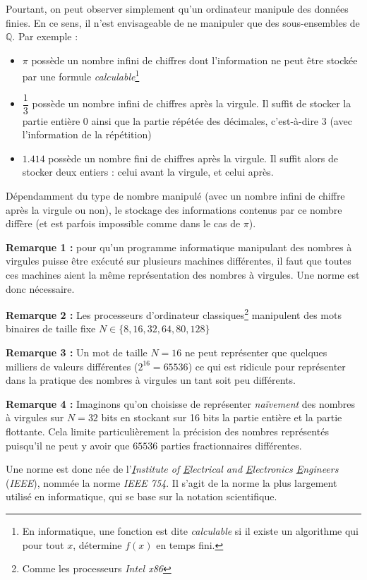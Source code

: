 \documentclass[../../main.tex]{subfiles}
\begin{document}
Pourtant, on peut observer simplement qu'un ordinateur manipule des données finies. En ce sens, il n'est envisageable de ne manipuler que des sous-ensembles de $\mathbb{Q}$. Par exemple :
\begin{itemize}
     \item $\pi$ possède un nombre infini de chiffres dont l'information ne peut être stockée par une formule \textit{calculable}\footnote{En informatique, une fonction est dite \textit{calculable} si il existe un algorithme qui pour tout $x$, détermine $f(x)$ en temps fini.}
     \item $\dfrac{1}{3}$ possède un nombre infini de chiffres après la virgule. Il suffit de stocker la partie entière $0$ ainsi que la partie répétée des décimales, c'est-à-dire $3$ (avec l'information de la répétition)
     \item $1.414$ possède un nombre fini de chiffres après la virgule. Il suffit alors de stocker deux entiers : celui avant la virgule, et celui après.
\end{itemize}
Dépendamment du type de nombre manipulé (avec un nombre infini de chiffre après la virgule ou non), le stockage des informations contenus par ce nombre diffère (et est parfois impossible comme dans le cas de $\pi$).

\textbf{Remarque 1 :} pour qu'un programme informatique manipulant des nombres à virgules puisse être exécuté sur plusieurs machines différentes, il faut que toutes ces machines aient la même représentation des nombres à virgules. Une norme est donc nécessaire.

\textbf{Remarque 2 :} Les processeurs d'ordinateur classiques\footnote{Comme les processeurs \textit{Intel x86}} manipulent des mots binaires de taille fixe $N\in\{8, 16, 32, 64, 80, 128\}$

\textbf{Remarque 3 :} Un mot de taille $N = 16$ ne peut représenter que quelques milliers de valeurs différentes ($2^{16} = 65536$) ce qui est ridicule pour représenter dans la pratique des nombres à virgules un tant soit peu différents.

\textbf{Remarque 4 :} Imaginons qu'on choisisse de représenter \textit{naïvement} des nombres à virgules sur $N = 32$ bits en stockant sur 16 bits la partie entière et la partie flottante. Cela limite particulièrement la précision des nombres représentés puisqu'il ne peut y avoir que $65536$ parties fractionnaires différentes.

Une norme est donc née de l'\textit{\underline{I}nstitute of \underline{E}lectrical and \underline{E}lectronics \underline{E}ngineers} (\textit{IEEE}), nommée la norme \textit{IEEE 754}. Il s'agit de la norme la plus largement utilisé en informatique, qui se base sur la notation scientifique.
\end{document}
